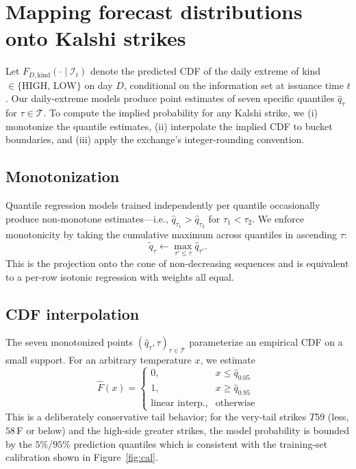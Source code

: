 \documentclass[11pt]{article}
\begin{document}
\section{Mapping forecast distributions onto Kalshi strikes}
\label{sec:strike-map}

Let $F_{D,\text{kind}}(\cdot \mid \mathcal{I}_t)$ denote the predicted CDF
of the daily extreme of kind $\in \{\text{HIGH, LOW}\}$ on day $D$,
conditional on the information set at issuance time $t$. Our daily-extreme
models produce point estimates of seven specific quantiles
$\hat{q}_\tau$ for $\tau \in \mathcal{T}$. To compute the implied
probability for any Kalshi strike, we (i) monotonize the quantile estimates,
(ii) interpolate the implied CDF to bucket boundaries, and (iii) apply the
exchange's integer-rounding convention.

\subsection{Monotonization}

Quantile regression models trained independently per quantile occasionally
produce non-monotone estimates---i.e., $\hat{q}_{\tau_1} > \hat{q}_{\tau_2}$
for $\tau_1 < \tau_2$. We enforce monotonicity by taking the cumulative
maximum across quantiles in ascending $\tau$:
\[
\tilde{q}_\tau \gets \max_{\tau' \le \tau} \hat{q}_{\tau'}.
\]
This is the projection onto the cone of non-decreasing sequences and is
equivalent to a per-row isotonic regression with weights all equal.

\subsection{CDF interpolation}

The seven monotonized points $(\hat{q}_\tau, \tau)_{\tau \in \mathcal{T}}$
parameterize an empirical CDF on a small support. For an arbitrary
temperature $x$, we estimate
\[
\hat{F}(x) = \begin{cases}
0, & x \le \hat{q}_{0.05} \\
1, & x \ge \hat{q}_{0.95} \\
\text{linear interp.}, & \text{otherwise}
\end{cases}
\]
This is a deliberately conservative tail behavior; for the very-tail strikes
$T59$ (\textsf{less}, $58$\,\textdegree F or below) and the high-side
\textsf{greater} strikes, the model probability is bounded by the
$5\%$/$95\%$ prediction quantiles which is consistent with the
training-set calibration shown in Figure~\ref{fig:cal}.
\end{document}
